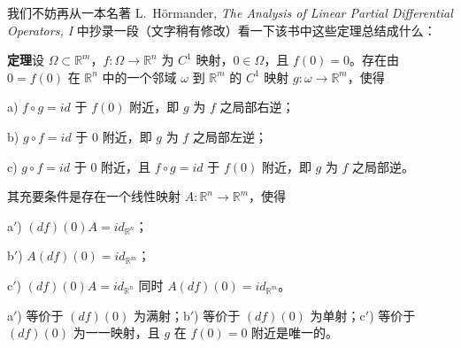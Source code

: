 我们不妨再从一本名著 L.~Hörmander, \textit{The Analysis of Linear Partial Differential Operators, I} 中抄录一段（文字稍有修改）看一下该书中这些定理总结成什么：

\noindent\textbf{定理}\quad 设 $\Omega\subset\mathbb R^m$，$f:\Omega\to\mathbb R^n$ 为 $C^1$ 映射，$0\in\Omega$，且 $f(0)=0$。存在由 $0=f(0)$ 在 $\mathbb R^n$ 中的一个邻域 $\omega$ 到 $\mathbb R^m$ 的 $C^1$ 映射 $g:\omega\to\mathbb R^m$，使得

\noindent a) $f\circ g=id$ 于 $f(0)$ 附近，即 $g$ 为 $f$ 之局部右逆；

\noindent b) $g\circ f=id$ 于 $0$ 附近，即 $g$ 为 $f$ 之局部左逆；

\noindent c) $g\circ f=id$ 于 $0$ 附近，且 $f\circ g=id$ 于 $f(0)$ 附近，即 $g$ 为 $f$ 之局部逆。

其充要条件是存在一个线性映射 $A:\mathbb R^n\to\mathbb R^m$，使得

\noindent a$'$) $(df)(0)A=id_{\mathbb R^n}$；

\noindent b$'$) $A(df)(0)=id_{\mathbb R^m}$；

\noindent c$'$) $(df)(0)A=id_{\mathbb R^n}$ 同时 $A(df)(0)=id_{\mathbb R^m}$。

a$'$) 等价于 $(df)(0)$ 为满射；b$'$) 等价于 $(df)(0)$ 为单射；c$'$) 等价于 $(df)(0)$ 为一一映射，且 $g$ 在 $f(0)=0$ 附近是唯一的。

